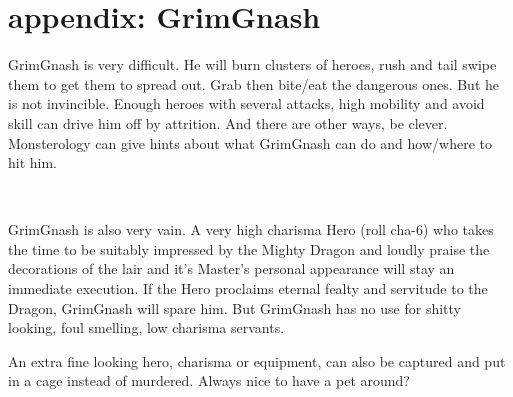 































\clearpage
\raggedbottom
\section*{appendix: GrimGnash}
\label{appendixgrimgnash}

GrimGnash is very difficult. He will burn clusters of heroes, rush and tail swipe them to get them to spread out. Grab then bite/eat the dangerous ones. But he is not invincible. Enough heroes with several attacks, high mobility and avoid skill can drive him off by attrition. And there are other ways, be clever. Monsterology can give hints about what GrimGnash can do and how/where to hit him.

\

GrimGnash is also very vain. A very high charisma Hero (roll cha-6) who takes the time to be suitably impressed by the Mighty Dragon and loudly praise the decorations of the lair and it's Master's personal appearance will stay an immediate execution. If the Hero proclaims eternal fealty and servitude to the Dragon, GrimGnash will spare him. But GrimGnash has no use for shitty looking, foul smelling, low charisma servants.

An extra fine looking hero, charisma or equipment, can also be captured and put in a cage instead of murdered. Always nice to have a pet around?

\

